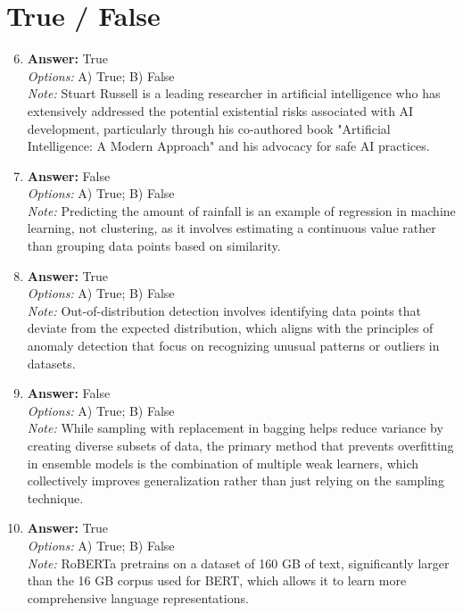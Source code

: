 \documentclass[12pt]{article}
\begin{document}
\section*{True / False}
\begin{enumerate}[label=\arabic*.]
\setcounter{enumi}{5}
\item \textbf{Answer:} True
\\ \textit{Options:} A) True; B) False
\\ \textit{Note:} Stuart Russell is a leading researcher in artificial intelligence who has extensively addressed the potential existential risks associated with AI development, particularly through his co-authored book "Artificial Intelligence: A Modern Approach" and his advocacy for safe AI practices.
\item \textbf{Answer:} False
\\ \textit{Options:} A) True; B) False
\\ \textit{Note:} Predicting the amount of rainfall is an example of regression in machine learning, not clustering, as it involves estimating a continuous value rather than grouping data points based on similarity.
\item \textbf{Answer:} True
\\ \textit{Options:} A) True; B) False
\\ \textit{Note:} Out-of-distribution detection involves identifying data points that deviate from the expected distribution, which aligns with the principles of anomaly detection that focus on recognizing unusual patterns or outliers in datasets.
\item \textbf{Answer:} False
\\ \textit{Options:} A) True; B) False
\\ \textit{Note:} While sampling with replacement in bagging helps reduce variance by creating diverse subsets of data, the primary method that prevents overfitting in ensemble models is the combination of multiple weak learners, which collectively improves generalization rather than just relying on the sampling technique.
\item \textbf{Answer:} True
\\ \textit{Options:} A) True; B) False
\\ \textit{Note:} RoBERTa pretrains on a dataset of 160 GB of text, significantly larger than the 16 GB corpus used for BERT, which allows it to learn more comprehensive language representations.
\end{enumerate}
\end{document}
